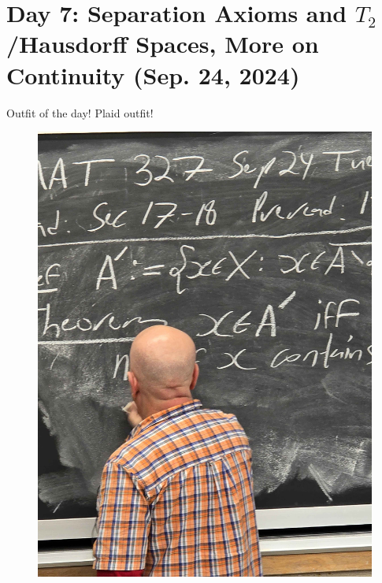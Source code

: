 \section{Day 7: Separation Axioms and \texorpdfstring{$T_2$}{T2}/Hausdorff Spaces, More on Continuity (Sep. 24, 2024)}
Outfit of the day! Plaid outfit!
\begin{figure}[h]
    \centering
    \includegraphics[scale=0.1]{MAT327 Notes/Dror Shirts/dror day 7 shirt.jpg}
\end{figure}

